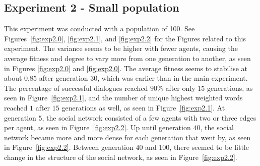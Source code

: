 \clearpage
\subsection{Experiment 2 - Small population}
This experiment was conducted with a population of 100. See Figures~\ref{fig:exp2.0}, \ref{fig:exp2.1}, and \ref{fig:exp2.2} for the Figures related to this experiment. The variance seems to be higher with fewer agents, causing the average fitness and degree to vary more from one generation to another, as seen in Figures \ref{fig:exp2.0} and \ref{fig:exp2.0}. The average fitness seems to stabilise at about $0.85$ after generation $30$, which was earlier than in the main experiment. The percentage of successful dialogues reached $90\%$ after only $15$ generations, as seen in Figure~\ref{fig:exp2.1}, and the number of unique highest weighted words reached $1$ after $15$ generations as well, as seen in Figure~\ref{fig:exp2.1}. At generation $5$, the social network consisted of a few agents with two or three edges per agent, as seen in Figure~\ref{fig:exp2.2}. Up until generation $40$, the social network became more and more dense for each generation that went by, as seen in Figure~\ref{fig:exp2.2}. Between generation $40$ and $100$, there seemed to be little change in the structure of the social network, as seen in Figure~\ref{fig:exp2.2}.

